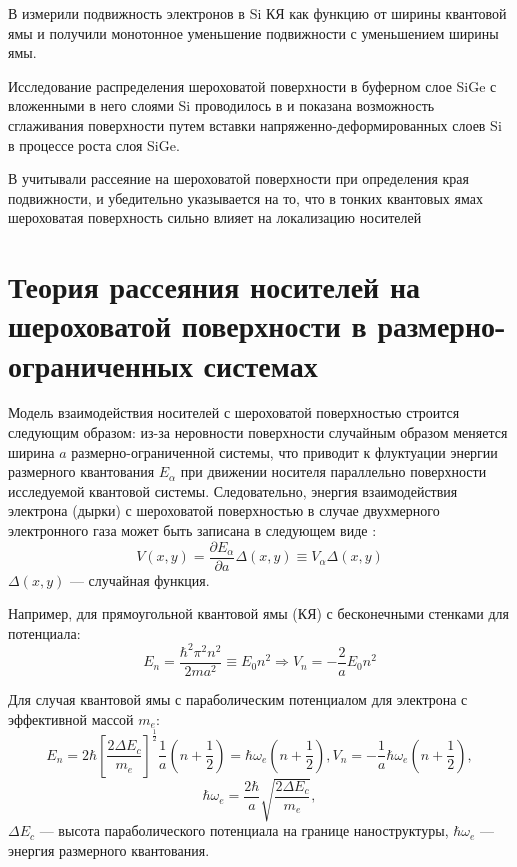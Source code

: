 В \cite{Yutani1996} измерили подвижность электронов в Si КЯ как функцию от ширины квантовой ямы и получили монотонное уменьшение подвижности с уменьшением ширины ямы.

Исследование распределения шероховатой поверхности в буферном слое SiGe с вложенными в него слоями Si проводилось в \cite{Yoon2005} и показана возможность сглаживания поверхности путем вставки напряженно-деформированных слоев Si в процессе роста слоя SiGe.

В \cite{Tito2017} учитывали рассеяние на шероховатой поверхности при определения края подвижности, и убедительно указывается на то, что в тонких квантовых ямах шероховатая поверхность сильно влияет на локализацию носителей


\section{Теория рассеяния носителей на шероховатой поверхности в размерно-ограниченных системах} \label{sect1_2}
Модель взаимодействия носителей с шероховатой поверхностью строится следующим образом: из-за неровности поверхности случайным образом меняется ширина $a$ размерно-ограниченной системы, что приводит к флуктуации энергии размерного квантования $E_{\alpha}$ при движении носителя параллельно поверхности исследуемой квантовой системы. Следовательно, энергия взаимодействия электрона (дырки) с шероховатой поверхностью в случае двухмерного электронного газа может быть записана в следующем виде \cite{Sakaki1987}:
\begin{equation}
\label{eq:1_1}
V(x,y)=\frac{\partial E_{\alpha}}{\partial a}\Delta(x,y)\equiv V_{\alpha} \Delta(x,y)
\end{equation}
$\Delta(x,y)$ --- случайная функция.

Например, для прямоугольной квантовой ямы (КЯ) с бесконечными стенками для потенциала:
\begin{equation}
\label{eq:1_2}
E_n = \frac{\hbar^2 \pi^2 n^2}{2ma^2} \equiv E_0 n^2 \Rightarrow V_n = -\frac{2}{a}E_0 n^2
\end{equation}

Для случая квантовой ямы с параболическим потенциалом для электрона с эффективной массой $m_e$:
\begin{equation}
\label{eq:1_3}
E_n=2\hbar \left[ \frac{2\Delta E_c} {m_e} \right]^\frac{1}{2} \frac{1}{a}\left( n + \frac{1}{2} \right) = \hbar \omega_e \left( n + \frac{1}{2} \right), V_n = -\frac{1}{a} \hbar \omega_e \left( n + \frac{1}{2} \right),
\end{equation}
\[
\hbar \omega_e = \frac{2\hbar}{a}\sqrt{\frac{2 \Delta E_c}{m_e}},
\]
$\Delta E_c$ --- высота параболического потенциала на границе наноструктуры, $\hbar \omega_e$ --- энергия размерного квантования.

